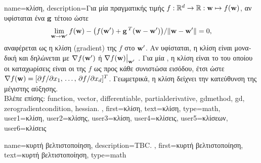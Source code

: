 {name={\foreignlanguage{greek}{κλίση}},
	description={\foreignlanguage{greek}{Για μία} 
		 \foreignlanguage{greek}{πραγματικής τιμής 
		$f: \mathbb{R}^{d} \rightarrow \mathbb{R}: {\bf w} \mapsto f({\bf w})$, 
		αν υφίσταται ένα}  ${\bf g}$ \foreignlanguage{greek}{τέτοιο ώστε 
		$$\lim_{{\bf w} \rightarrow {\bf w}'} {f({\bf w}) - \big(f({\bf w}') + {\bf g}\,^{T} ({\bf w} - {\bf w}') \big) }/{\| {\bf w} - {\bf w}'\|}=0,$$
		αναφέρεται ως η κλίση} (gradient) \foreignlanguage{greek}{της $f$ στο ${\bf w}'$. Αν υφίσταται, η κλίση είναι μοναδική και 
		δηλώνεται με $\nabla f({\bf w}')$ ή} $\nabla f({\bf w})\big|_{{\bf w}'}$ \cite{RudinBookPrinciplesMatheAnalysis}.
		\foreignlanguage{greek}{Για μία}  , \foreignlanguage{greek}{η κλίση είναι το} 
		 \foreignlanguage{greek}{του οποίου οι καταχωρίσεις είναι οι}  
		\foreignlanguage{greek}{της $f$ ως προς κάθε συνιστώσα εισόδου, έτσι ώστε  
		$\nabla f({\bf w}) = [{\partial f}/{\partial x_1}, \,\dots, \,{\partial f}/{\partial x_{d}}]^T$. 
		Γεωμετρικά, η κλίση δείχνει την κατεύθυνση της μέγιστης αύξησης}.
		\\
		\foreignlanguage{greek}{Βλέπε επίσης:} \gls{function}, \gls{vector}, \gls{differentiable}, \gls{partialderivative}, \gls{gdmethod}, \gls{gd}, 
		\gls{zerogradientcondition},  \gls{hessian}. },
	first={\foreignlanguage{greek}{κλίση}},
	text={\foreignlanguage{greek}{κλίση}},
	type=math, 
	user1={\foreignlanguage{greek}{κλίση}}, %
  	user2={\foreignlanguage{greek}{κλίσης}}, %
	user3={\foreignlanguage{greek}{κλίση}}, %
	user4={\foreignlanguage{greek}{κλίσεις}}, %
  	user5={\foreignlanguage{greek}{κλίσεων}}, %
	user6={\foreignlanguage{greek}{κλίσεις}} %
}

{name={\foreignlanguage{greek}{κυρτή βελτιστοποίηση}},
 	description={TBC. },
	first={\foreignlanguage{greek}{κυρτή βελτιστοποίηση}},
  	text={\foreignlanguage{greek}{κυρτή βελτιστοποίηση}},
	type=math
}

